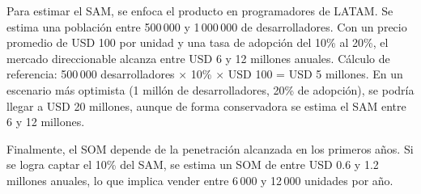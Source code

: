 \documentclass[manuscript,screen,review]{acmart}
\begin{document}
Para estimar el SAM, se enfoca el producto en programadores de LATAM. Se estima una población entre 500\,000 y 1\,000\,000 de desarrolladores. Con un precio promedio de USD 100 por unidad y una tasa de adopción del 10\% al 20\%, el mercado direccionable alcanza entre USD 6 y 12 millones anuales. Cálculo de referencia: 500\,000 desarrolladores $\times$ 10\% $\times$ USD 100 = USD 5 millones. En un escenario más optimista (1 millón de desarrolladores, 20\% de adopción), se podría llegar a USD 20 millones, aunque de forma conservadora se estima el SAM entre 6 y 12 millones.

Finalmente, el SOM depende de la penetración alcanzada en los primeros años. Si se logra captar el 10\% del SAM, se estima un SOM de entre USD 0.6 y 1.2 millones anuales, lo que implica vender entre 6\,000 y 12\,000 unidades por año.



\end{document}

